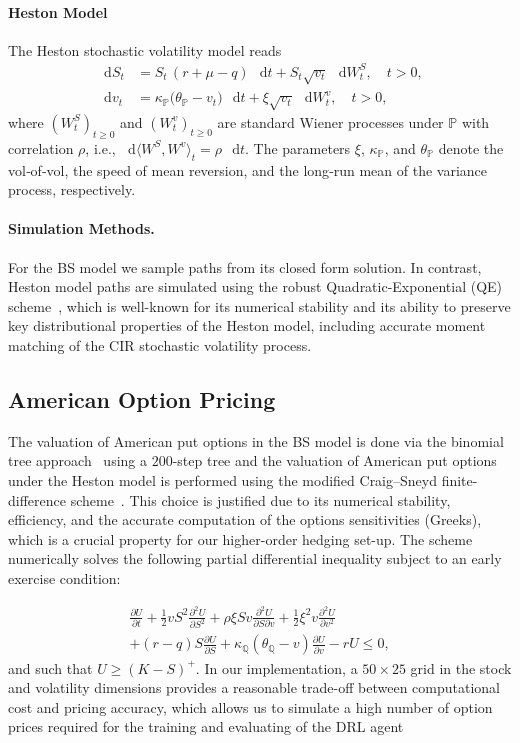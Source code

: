\documentclass[a4paper,fleqn]{cas-dc}
\newcommand*\D{\mathop{}\!\mathrm{d}}
\begin{document}
\paragraph{Heston Model}
The Heston stochastic volatility model reads
\begin{align*}
\D S_t &= S_t\,(r+\mu - q)\,\D t + S_t\sqrt{v_t}\,\D W_t^{S}, \quad t>0,\\
\D v_t &= \kappa_{\mathbb{P}}\big(\theta_{\mathbb{P}} - v_t\big)\,\D t + \xi \sqrt{v_t}\,\D W_t^{v}, \quad t>0,
\end{align*}
where $(W_t^{S})_{t\geq 0}$ and $(W_t^{v})_{t\geq 0}$ are standard Wiener processes under $\mathbb{P}$ with correlation $\rho$, i.e., $\D\langle W^{S}, W^{v}\rangle_t=\rho\,\D t$. The parameters $\xi$, $\kappa_{\mathbb{P}}$, and $\theta_{\mathbb{P}}$ denote the vol‑of‑vol, the speed of mean reversion, and the long‑run mean of the variance process, respectively.


\paragraph{Simulation Methods.}
For the BS model we sample paths from its closed form solution. In contrast, Heston model paths are simulated using the robust Quadratic-Exponential (QE) scheme~\cite{heston_sim}, which is well-known for its numerical stability and its ability to preserve key distributional properties of the Heston model, including accurate moment matching of the CIR stochastic volatility process.

\subsection{American Option Pricing} 
The valuation of American put options in the BS model is done via the binomial tree approach~\cite{ccr} using a $200$-step tree and the valuation of American put options under the Heston model is performed using the modified Craig–Sneyd finite-difference scheme~\cite{MCS_og, hestonADI}. This choice is justified due to its numerical stability, efficiency, and the accurate computation of the options sensitivities (Greeks), which is a crucial property for our higher-order hedging set-up. The scheme numerically solves the following partial differential inequality subject to an early exercise condition:

\begin{multline*}
\frac{\partial U}{\partial t} 
+ \frac{1}{2} v S^2 \frac{\partial^2 U}{\partial S^2} 
+ \rho \xi S v \frac{\partial^2 U}{\partial S \partial v} 
+ \frac{1}{2} \xi^2 v \frac{\partial^2 U}{\partial v^2} \\
+ (r - q) S \frac{\partial U}{\partial S} 
+ \kappa_{\mathbb{Q}}(\theta_{\mathbb{Q}} - v) \frac{\partial U}{\partial v} 
- r U \leq 0,
\end{multline*}
and such that $U \geq (K - S)^+ $. In our implementation, a $50 \times 25$ grid in the stock and volatility dimensions provides a reasonable trade-off between computational cost and pricing accuracy, which allows us to simulate a high number of option prices required for the training and evaluating of the DRL agent %
\end{document}
